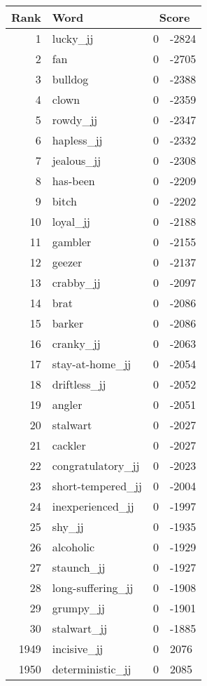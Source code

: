 \begin{longtable}[!htbp]{| rlr@{.}l |}
    \hline
    \textbf{Rank} & \textbf{Word} & \multicolumn{2}{c|}{\textbf{Score}} \\
    \hline
    \endhead
    1 & lucky\_jj & 0 & -2824 \\
    2 & fan & 0 & -2705 \\
    3 & bulldog & 0 & -2388 \\
    4 & clown & 0 & -2359 \\
    5 & rowdy\_jj & 0 & -2347 \\
    6 & hapless\_jj & 0 & -2332 \\
    7 & jealous\_jj & 0 & -2308 \\
    8 & has-been & 0 & -2209 \\
    9 & bitch & 0 & -2202 \\
    10 & loyal\_jj & 0 & -2188 \\
    11 & gambler & 0 & -2155 \\
    12 & geezer & 0 & -2137 \\
    13 & crabby\_jj & 0 & -2097 \\
    14 & brat & 0 & -2086 \\
    15 & barker & 0 & -2086 \\
    16 & cranky\_jj & 0 & -2063 \\
    17 & stay-at-home\_jj & 0 & -2054 \\
    18 & driftless\_jj & 0 & -2052 \\
    19 & angler & 0 & -2051 \\
    20 & stalwart & 0 & -2027 \\
    21 & cackler & 0 & -2027 \\
    22 & congratulatory\_jj & 0 & -2023 \\
    23 & short-tempered\_jj & 0 & -2004 \\
    24 & inexperienced\_jj & 0 & -1997 \\
    25 & shy\_jj & 0 & -1935 \\
    26 & alcoholic & 0 & -1929 \\
    27 & staunch\_jj & 0 & -1927 \\
    28 & long-suffering\_jj & 0 & -1908 \\
    29 & grumpy\_jj & 0 & -1901 \\
    30 & stalwart\_jj & 0 & -1885 \\
    1949 & incisive\_jj & 0 & 2076 \\
    1950 & deterministic\_jj & 0 & 2085 \\

\end{longtable}
